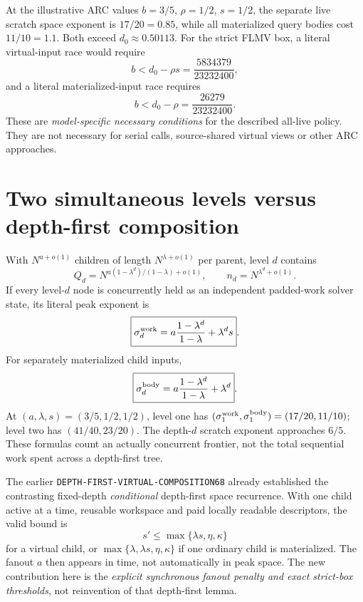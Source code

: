 \documentclass[11pt]{article}
\begin{document}
At the illustrative ARC values $b=3/5$, $\rho=1/2$, $s=1/2$, the separate live scratch space exponent is $17/20=0.85$, while all materialized query bodies cost $11/10=1.1$. Both exceed $d_0\approx0.50113$. For the strict FLMV box, a literal virtual-input race would require
\[
\boxed{b<d_0-\rho s=\frac{5834379}{23232400}},
\]
and a literal materialized-input race requires
\[
\boxed{b<d_0-\rho=\frac{26279}{23232400}}.
\]
These are \emph{model-specific necessary conditions} for the described all-live policy. They are not necessary for serial calls, source-shared virtual views or other ARC approaches.

\section{Two simultaneous levels versus depth-first composition}
With $N^{a+o(1)}$ children of length $N^{\lambda+o(1)}$ per parent, level $d$ contains
\[
Q_d=N^{a(1-\lambda^d)/(1-\lambda)+o(1)},\qquad
n_d=N^{\lambda^d+o(1)}.
\]
If every level-$d$ node is concurrently held as an independent padded-work solver state, its literal peak exponent is
\[
\boxed{\sigma_d^{\rm work}
=a\frac{1-\lambda^d}{1-\lambda}+\lambda^d s}.
\]
For separately materialized child inputs,
\[
\boxed{\sigma_d^{\rm body}
=a\frac{1-\lambda^d}{1-\lambda}+\lambda^d}.
\]
At $(a,\lambda,s)=(3/5,1/2,1/2)$, level one has $(\sigma_1^{\rm work},\sigma_1^{\rm body})=(17/20,11/10)$; level two has $(41/40,23/20)$. The depth-$d$ scratch exponent approaches $6/5$. These formulas count an actually concurrent frontier, not the total sequential work spent across a depth-first tree.

The earlier \texttt{DEPTH-FIRST-VIRTUAL-COMPOSITION68} already established the contrasting fixed-depth \emph{conditional} depth-first space recurrence. With one child active at a time, reusable workspace and paid locally readable descriptors, the valid bound is
\[
s'\le\max\{\lambda s,\eta,\kappa\}
\]
for a virtual child, or $\max\{\lambda,\lambda s,\eta,\kappa\}$ if one ordinary child is materialized. The fanout $a$ then appears in time, not automatically in peak space. The new contribution here is the \emph{explicit synchronous fanout penalty and exact strict-box thresholds}, not reinvention of that depth-first lemma.
\end{document}
